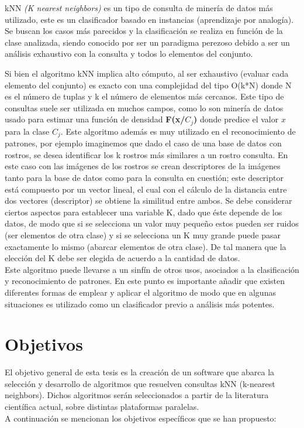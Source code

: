 kNN \textit{(K nearest neighbors)} es un tipo de consulta de minería de datos más utilizado, este es un clasificador basado en instancias (aprendizaje por analogía). Se buscan los casos más parecidos y la clasificación se realiza en función de la clase analizada, siendo conocido por ser un paradigma perezoso debido a ser un análisis exhaustivo con la consulta y todos lo elementos del conjunto.

Si bien el algoritmo kNN implica alto cómputo, al ser exhaustivo (evaluar cada elemento del conjunto) es exacto con una complejidad del tipo O(k*N) donde N es el número de tuplas y k el número de elementos más cercanos. Este tipo de consultas suele ser utilizada en muchos campos, como lo son minería de datos usado para estimar una función de densidad \textbf{F(x/$C_j$)} donde predice el valor $x$ para la clase $C_j$. Este algoritmo además es muy utilizado en el reconocimiento de patrones, por ejemplo imaginemos que dado el caso de una base de datos con rostros, se desea identificar los k rostros más similares a un rostro consulta. En este caso con las imágenes de los rostros se crean descriptores de la imágenes tanto para la base de datos como para la consulta en cuestión; este descriptor está compuesto por un vector lineal, el cual con el cálculo de la distancia entre dos vectores (descriptor) se obtiene la similitud entre ambos. Se debe considerar ciertos aspectos para establecer una variable K, dado que éste depende de los datos, de modo que si se selecciona un valor muy pequeño estos pueden ser ruidos (ser elementos de otra clase) y si se selecciona un K muy grande puede pasar exactamente lo mismo (abarcar elementos de otra clase). De tal manera que la elección del K debe ser elegida de acuerdo a la cantidad de datos.\\

Este algoritmo puede llevarse a un sinfín de otros usos, asociados a la clasificación y reconocimiento de patrones. En este punto es importante añadir que existen diferentes formas de emplear y aplicar el algoritmo de modo que en algunas situaciones es utilizado como un clasificador previo a análisis más potentes.   

\section{Objetivos}

El objetivo general de esta tesis es la creación de un software que abarca la selección y desarrollo de algoritmos que resuelven consultas kNN (k-nearest neighbors).  Dichos algoritmos serán seleccionados a partir de la literatura científica actual, sobre distintas plataformas paralelas.
\\
A continuación se mencionan los objetivos específicos que se han propuesto:

